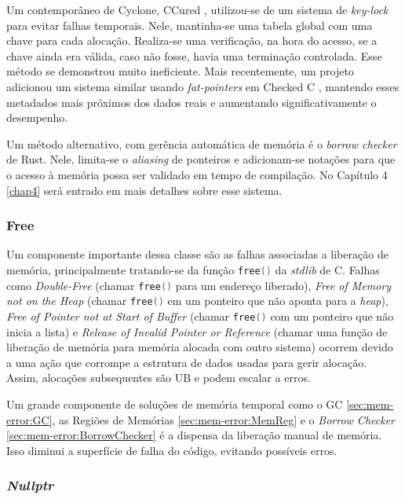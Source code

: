 \label{sec:mem-error:KeyLock}
Um contemporâneo de Cyclone, CCured \cite{CCURED}, utilizou-se de um sistema de \emph{key-lock} para evitar falhas temporais. Nele, mantinha-se uma tabela global com uma chave para cada alocação. Realiza-se uma verificação, na hora do acesso, se a chave ainda era válida, caso não fosse, havia uma terminação controlada. Esse método se demonstrou muito ineficiente. Mais recentemente, um projeto adicionou um sistema similar usando \emph{fat-pointers} em Checked C \cite{FATPOINTERS}, mantendo esses metadados mais próximos dos dados reais e aumentando significativamente o desempenho.

\label{sec:mem-error:BorrowChecker}
Um método alternativo, com gerência automática de memória é o \emph{borrow checker} de Rust. Nele, limita-se o \emph{aliasing} de ponteiros e adicionam-se notações para que o acesso à memória possa ser validado em tempo de compilação. No Capítulo 4 \ref{chap4} será entrado em mais detalhes sobre esse sistema.

\subsubsection{Free}
\label{sec:mem-error:temporal:free}

\newcommand{\FREE}{\lstinline[language=C]|free()| }

Um componente importante dessa classe são as falhas associadas a liberação de memória, principalmente tratando-se da função \FREE da \emph{stdlib} de C. Falhas como \emph{Double-Free} (chamar \FREE para um endereço liberado), \emph{Free of Memory not on the Heap} (chamar \FREE em um ponteiro que não aponta para a \emph{heap}), \emph{Free of Pointer not at Start of Buffer} (chamar \FREE com um ponteiro que não inicia a lista) e \emph{Release of Invalid Pointer or Reference} (chamar uma função de liberação de memória para memória alocada com outro sistema) ocorrem devido a uma ação que corrompe a estrutura de dados usadas para gerir alocação. Assim, alocações subsequentes são UB e podem escalar a erros.

Um grande componente de soluções de memória temporal como o GC \ref{sec:mem-error:GC}, as Regiões de Memórias \ref{sec:mem-error:MemReg} e o \emph{Borrow Checker} \ref{sec:mem-error:BorrowChecker} é a dispensa da liberação manual de memória. Isso diminui a superfície de falha do código, evitando possíveis erros.

\subsubsection{\emph{Nullptr}}
\label{sec:mem-error:temporal:null}

